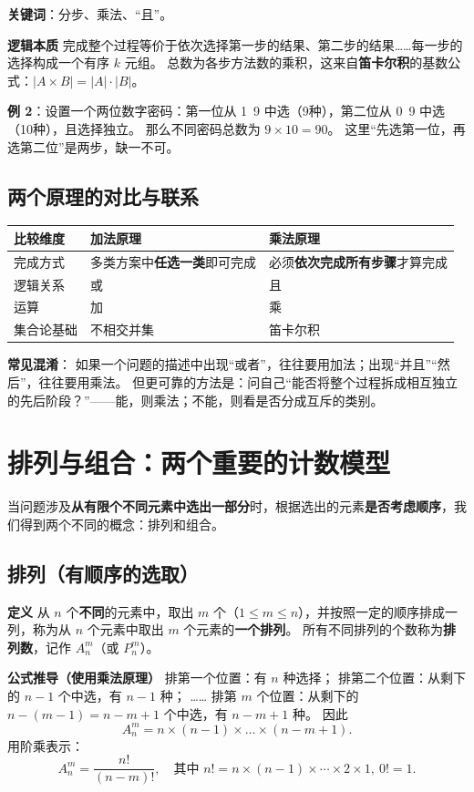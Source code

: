 \documentclass[10pt]{article}
\begin{document}
\textbf{关键词}：分步、乘法、“且”。

\textbf{逻辑本质}
完成整个过程等价于依次选择第一步的结果、第二步的结果……每一步的选择构成一个有序 \(k\) 元组。
总数为各步方法数的乘积，这来自\textbf{笛卡尔积}的基数公式：\(|A \times B| = |A| \cdot |B|\)。

\textbf{例 2}：设置一个两位数字密码：第一位从 1~9 中选（9种），第二位从 0~9 中选（10种），且选择独立。
那么不同密码总数为 \(9 \times 10 = 90\)。
这里“先选第一位，再选第二位”是两步，缺一不可。

\subsection{两个原理的对比与联系}

\begin{tabular}{|l|l|l|}
\hline
比较维度 & 加法原理 & 乘法原理 \\
\hline
完成方式 & 多类方案中\textbf{任选一类}即可完成 & 必须\textbf{依次完成所有步骤}才算完成 \\
\hline
逻辑关系 & 或 & 且 \\
\hline
运算 & 加 & 乘 \\
\hline
集合论基础 & 不相交并集 & 笛卡尔积 \\
\hline
\end{tabular}

\textbf{常见混淆}：
如果一个问题的描述中出现“或者”，往往要用加法；出现“并且”“然后”，往往要用乘法。
但更可靠的方法是：问自己“能否将整个过程拆成相互独立的先后阶段？”——能，则乘法；不能，则看是否分成互斥的类别。

\section{排列与组合：两个重要的计数模型}

当问题涉及\textbf{从有限个不同元素中选出一部分}时，根据选出的元素\textbf{是否考虑顺序}，我们得到两个不同的概念：排列和组合。

\subsection{排列（有顺序的选取）}

\textbf{定义}
从 \(n\) 个\textbf{不同}的元素中，取出 \(m\) 个（\(1 \le m \le n\)），并按照一定的顺序排成一列，称为从 \(n\) 个元素中取出 \(m\) 个元素的\textbf{一个排列}。
所有不同排列的个数称为\textbf{排列数}，记作 \(A_n^m\)（或 \(P_n^m\)）。

\textbf{公式推导（使用乘法原理）}
排第一个位置：有 \(n\) 种选择；
排第二个位置：从剩下的 \(n-1\) 个中选，有 \(n-1\) 种；
……
排第 \(m\) 个位置：从剩下的 \(n - (m-1) = n-m+1\) 个中选，有 \(n-m+1\) 种。
因此
\[
A_n^m = n \times (n-1) \times \dots \times (n-m+1).
\]
用阶乘表示：
\[
A_n^m = \frac{n!}{(n-m)!}, \quad \text{其中 } n! = n \times (n-1) \times \cdots \times 2 \times 1,\ 0! = 1.
\]
\end{document}
